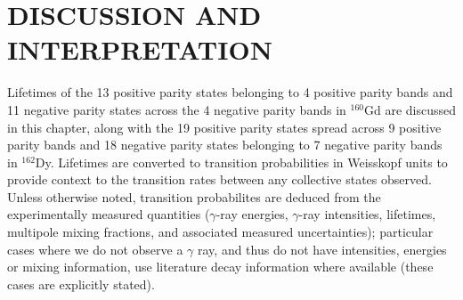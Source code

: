 %
%

\chapter{DISCUSSION AND INTERPRETATION}\label{chp:discussion}

% 


Lifetimes of the 13 positive parity states belonging to 4 positive parity bands and 11 negative parity states across the 4 negative parity bands in $^{160}$Gd are discussed in this chapter, along with the 19 positive parity states spread across 9 positive parity bands and 18 negative parity states belonging to 7 negative parity bands in $^{162}$Dy. Lifetimes are converted to transition probabilities in Weisskopf units to provide context to the transition rates between any collective states observed. Unless otherwise noted, transition probabilites are deduced from the experimentally measured quantities ($\gamma$-ray energies, $\gamma$-ray intensities, lifetimes, multipole mixing fractions, and associated measured uncertainties); particular cases where we do not observe a $\gamma$ ray, and thus do not have intensities, energies or mixing information, use literature decay information where available (these cases are explicitly stated).


